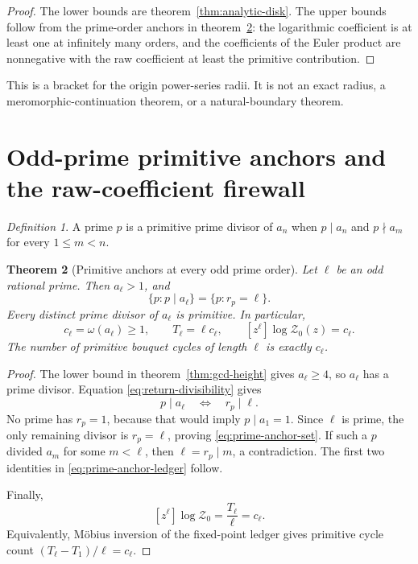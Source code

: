 \documentclass[11pt]{article}
\numberwithin{equation}{section}
\newtheorem{theorem}{Theorem}[section]
\theoremstyle{remark}
\newtheorem{definition}[theorem]{Definition}
\newcommand{\cZ}{\mathcal Z}
\begin{document}
\begin{proof}
The lower bounds are theorem~\ref{thm:analytic-disk}.  The upper bounds
follow from the prime-order anchors in theorem~\ref{thm:prime-anchors}:
the logarithmic coefficient is at least one at infinitely many orders, and
the coefficients of the Euler product are nonnegative with the raw
coefficient at least the primitive contribution.
\end{proof}

This is a bracket for the origin power-series radii.  It is not an exact
radius, a meromorphic-continuation theorem, or a natural-boundary theorem.

\section{Odd-prime primitive anchors and the raw-coefficient firewall}

\begin{definition}
A prime \(p\) is a primitive prime divisor of \(a_n\) when
\(
p\mid a_n
\)
and \(p\nmid a_m\) for every \(1\le m<n\).
\end{definition}

\begin{theorem}[Primitive anchors at every odd prime order]
\label{thm:prime-anchors}
Let \(\ell\) be an odd rational prime.  Then \(a_\ell>1\), and
\begin{equation}
 \{p:p\mid a_\ell\}
 =\{p:r_p=\ell\}.
 \label{eq:prime-anchor-set}
\end{equation}
Every distinct prime divisor of \(a_\ell\) is primitive.  In particular,
\begin{equation}
 c_\ell=\omega(a_\ell)\ge1,
 \qquad
 T_\ell=\ell c_\ell,
 \qquad
 [z^\ell]\log\cZ_0(z)=c_\ell.
 \label{eq:prime-anchor-ledger}
\end{equation}
The number of primitive bouquet cycles of length \(\ell\) is exactly
\(c_\ell\).
\end{theorem}

\begin{proof}
The lower bound in theorem~\ref{thm:gcd-height} gives \(a_\ell\ge4\), so
\(a_\ell\) has a prime divisor.  Equation \eqref{eq:return-divisibility}
gives
\[
 p\mid a_\ell
 \quad\Longleftrightarrow\quad
 r_p\mid\ell.
\]
No prime has \(r_p=1\), because that would imply \(p\mid a_1=1\).
Since \(\ell\) is prime, the only remaining divisor is \(r_p=\ell\), proving
\eqref{eq:prime-anchor-set}.  If such a \(p\) divided \(a_m\) for some
\(m<\ell\), then \(\ell=r_p\mid m\), a contradiction.  The first two
identities in \eqref{eq:prime-anchor-ledger} follow.

Finally,
\[
 [z^\ell]\log\cZ_0=\frac{T_\ell}{\ell}=c_\ell.
\]
Equivalently, M\"obius inversion of the fixed-point ledger gives primitive
cycle count
\(
(T_\ell-T_1)/\ell=c_\ell
\).
\end{proof}
\end{document}
